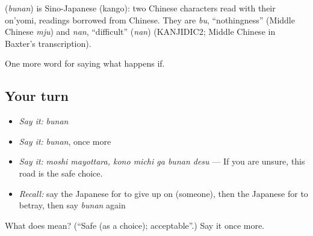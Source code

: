 \begin{cousinweb}
\textbf{} (\emph{bunan}) is Sino-Japanese (kango): two Chinese characters read with their on'yomi, readings borrowed from Chinese. They are \emph{bu}, \textquotedblleft{}nothingness\textquotedblright{} (Middle Chinese \emph{mju}) and \emph{nan}, \textquotedblleft{}difficult\textquotedblright{} (\emph{nan}) (KANJIDIC2; Middle Chinese in Baxter's transcription).
\end{cousinweb}

\begin{grammarlens}[title={What you've built}]
One more word for saying what happens if.
\end{grammarlens}

\subsection*{Your turn}
\begin{itemize}
\raggedright
  \item \emph{Say it:} \emph{bunan}
  \item \emph{Say it:} \emph{bunan}, once more
  \item \emph{Say it:} \emph{moshi mayottara, kono michi ga bunan desu} — If you are unsure, this road is the safe choice.
  \item \emph{Recall:} say the Japanese for to give up on (someone), then the Japanese for to betray, then say \emph{bunan} again
\end{itemize}

\begin{tcolorbox}[breakable,colback=teal!4,colframe=teal!35!black,title={Before you move on}]
What does  mean? (\textquotedblleft{}Safe (as a choice); acceptable\textquotedblright{}.) Say it once more.
\end{tcolorbox}
